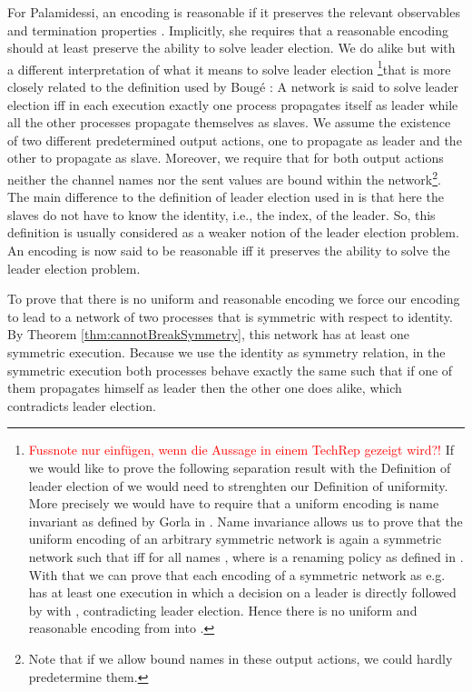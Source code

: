 \documentclass[11pt,techReport]{eptcs}
\begin{document}
For Palamidessi, an encoding is reasonable if it preserves the relevant observables and termination properties \cite{palamidessi03}. Implicitly, she requires that a reasonable encoding should at least preserve the ability to solve leader election. We  do alike but with a different interpretation of what it means to solve leader election \ifadraft\footnote{\textcolor{red}{Fussnote nur einfügen, wenn die Aussage in einem TechRep gezeigt wird?!} If we would like to prove the following separation result with the Definition of leader election of \cite{palamidessi03} we would need to strenghten our Definition of uniformity. More precisely we would have to require that a uniform encoding is name invariant as defined by Gorla in \cite{gorla08d}. Name invariance allows us to prove that the uniform encoding of an arbitrary symmetric network  is again a symmetric network  such that  iff  for all names , where  is a renaming policy as defined in \cite{gorla08d}. With that we can prove that each encoding of a symmetric network as e.g.  has at least one execution in which a decision on a leader  is directly followed by  with , contradicting leader election. Hence there is no uniform and reasonable encoding from \pimix into \pisep.}\fi that is more closely related to the definition used by Boug\'{e} \cite{bouge88}:
A network is said to solve leader election iff in each execution exactly one process propagates itself as leader while all the other processes propagate themselves as slaves. We assume the existence of two different predetermined output actions, one to propagate as leader and the other to propagate as slave. Moreover, we require that for both output actions neither the channel names nor the sent values are bound within the network\footnote{Note that if we allow bound names in these output actions, we could hardly predetermine them.}. The main difference to the definition of leader election used in \cite{palamidessi03} is that here the slaves do not have to know the identity, i.e., the index, of the leader. So, this definition is usually considered as a weaker notion of the leader election problem.  An encoding is now said to be reasonable iff it preserves the ability to solve the leader election problem.


To prove that there is no uniform and reasonable encoding we force our encoding to lead to a network of two processes that is symmetric with respect to identity. By Theorem \ref{thm:cannotBreakSymmetry}, this network has at least one symmetric execution. Because we use the identity as symmetry relation, in the symmetric execution both processes behave exactly the same such that if one of them propagates himself as leader then the other one does alike, which contradicts leader election.
\end{document}
